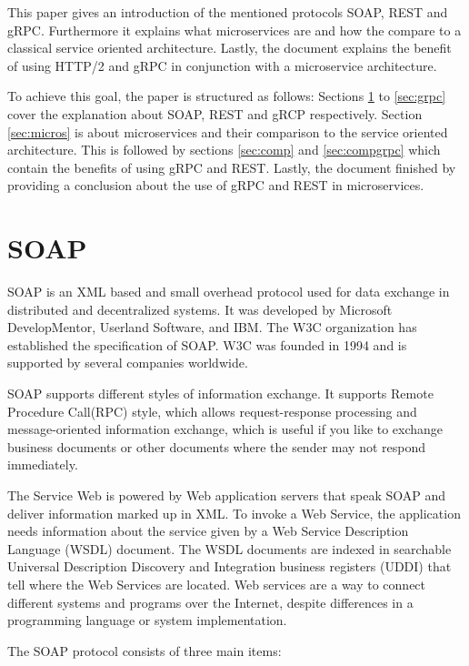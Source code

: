 \documentclass[conference]{IEEEtran}
\begin{document}
This paper gives an introduction of the mentioned protocols SOAP, REST and gRPC. Furthermore it explains what microservices are and how the compare to a classical service oriented architecture. Lastly, the document explains the benefit of using HTTP/2 and gRPC in conjunction with a microservice architecture.

To achieve this goal, the paper is structured as follows: Sections \ref{sec:soap} to \ref{sec:grpc} cover the explanation about SOAP, REST and gRCP respectively. Section \ref{sec:micros} is about microservices and their comparison to the service oriented architecture. This is followed by sections \ref{sec:comp} and \ref{sec:compgrpc} which contain the benefits of using gRPC and REST. Lastly, the document finished by providing a conclusion about the use of gRPC and REST in microservices.

\section{SOAP}
\label{sec:soap}

SOAP is an XML based and small overhead protocol used for data exchange in distributed and decentralized systems.
It was developed by Microsoft DevelopMentor, Userland Software, and IBM. The W3C organization has established the specification of SOAP. W3C was founded in 1994 and is supported by several companies worldwide. \cite{SOA-basic-overview-2002}

SOAP supports different styles of information exchange. It supports Remote Procedure Call(RPC) style, which allows request-response processing and message-oriented information exchange, which is useful if you like to exchange business documents or other documents where the sender may not respond immediately. \cite{SOA-basic-overview-2002}

The Service Web is powered by Web application servers that speak SOAP and deliver information marked up in XML. To invoke a Web Service, the application needs information about the service given by a Web Service Description Language (WSDL) document. The WSDL documents are indexed in searchable Universal Description Discovery and Integration business registers (UDDI) that tell where the Web Services are located. \cite{SOA-basic-overview-2002} Web services are a way to connect different systems and programs over the Internet, despite differences in a programming language or system implementation.

The SOAP protocol consists of three main items:
\end{document}
